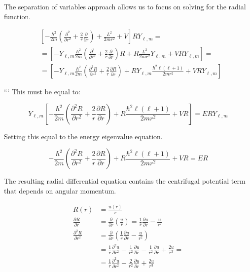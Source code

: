 \documentclass[italian]{HKNdocument}
\begin{document}
The separation of variables approach allows us to focus on solving for the radial function.

\begin{align*}
& {\left[-\frac{\hbar^{2}}{2 m}\left(\frac{\partial^{2}}{\partial r^{2}}+\frac{2}{r} \frac{\partial}{\partial r}\right)+\frac{L^{2}}{2 m r^{2}}+V\right] R Y_{\ell, m}=} \\
& =\left[-Y_{\ell, m} \frac{\hbar^{2}}{2 m}\left(\frac{\partial^{2}}{\partial r^{2}}+\frac{2}{r} \frac{\partial}{\partial r}\right) R+R \frac{L^{2}}{2 m r^{2}} Y_{\ell, m}+V R Y_{\ell, m}\right]=  \tag{9.31}\\
& =\left[-Y_{\ell, m} \frac{\hbar^{2}}{2 m}\left(\frac{\partial^{2} R}{\partial r^{2}}+\frac{2}{r} \frac{\partial R}{\partial r}\right)+R Y_{\ell, m} \frac{\hbar^{2} \ell(\ell+1)}{2 m r^{2}}+V R Y_{\ell, m}\right]
\end{align*}

```
This must be equal to:

\begin{equation*}
Y_{\ell, m}\left[-\frac{\hbar^{2}}{2 m}\left(\frac{\partial^{2} R}{\partial r^{2}}+\frac{2}{r} \frac{\partial R}{\partial r}\right)+R \frac{\hbar^{2} \ell(\ell+1)}{2 m r^{2}}+V R\right]=E R Y_{\ell, m} \tag{9.32}
\end{equation*}

Setting this equal to the energy eigenvalue equation.

\begin{equation*}
-\frac{\hbar^{2}}{2 m}\left(\frac{\partial^{2} R}{\partial r^{2}}+\frac{2}{r} \frac{\partial R}{\partial r}\right)+R \frac{\hbar^{2} \ell(\ell+1)}{2 m r^{2}}+V R=E R \tag{9.33}
\end{equation*}

The resulting radial differential equation contains the centrifugal potential term that depends on angular momentum.

\begin{align*}
R(r) & =\frac{u(r)}{r} \\
\frac{\partial R}{\partial r} & =\frac{\partial}{\partial r}\left(\frac{u}{r}\right)=\frac{1}{r} \frac{\partial u}{\partial r}-\frac{u}{r^{2}} \\
\frac{\partial^{2} R}{\partial r^{2}} & =\frac{\partial}{\partial r}\left(\frac{1}{r} \frac{\partial u}{\partial r}-\frac{u}{r^{2}}\right)  \tag{9.34}\\
& =\frac{1}{r} \frac{\partial^{2} u}{\partial r^{2}}-\frac{1}{r^{2}} \frac{\partial u}{\partial r}-\frac{1}{r^{2}} \frac{\partial u}{\partial r}+\frac{2 u}{r^{3}}= \\
& =\frac{1}{r} \frac{\partial^{2} u}{\partial r^{2}}-\frac{2}{r^{2}} \frac{\partial u}{\partial r}+\frac{2 u}{r^{3}}
\end{align*}
\end{document}
